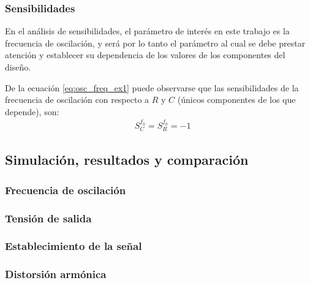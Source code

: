 \subsubsection{Sensibilidades}
En el análisis de sensibilidades, el parámetro de interés en este trabajo es la frecuencia de oscilación, y será por lo tanto el parámetro al cual se 
debe prestar atención y establecer su dependencia de los valores de los componentes del diseño.

De la ecuación \ref{eq:osc_freq_ex1} puede observarse que las sensibilidades de la frecuencia de oscilación con respecto a $R$ y $C$ (únicos componentes 
de los que depende), son:
\begin{align*}
    & S_C^{f_0} = S_R^{f_0} = -1
\end{align*}



\subsection{Simulación, resultados y comparación}
\subsubsection{Frecuencia de oscilación}


\subsubsection{Tensión de salida}


\subsubsection{Establecimiento de la señal}


\subsubsection{Distorsión armónica}

